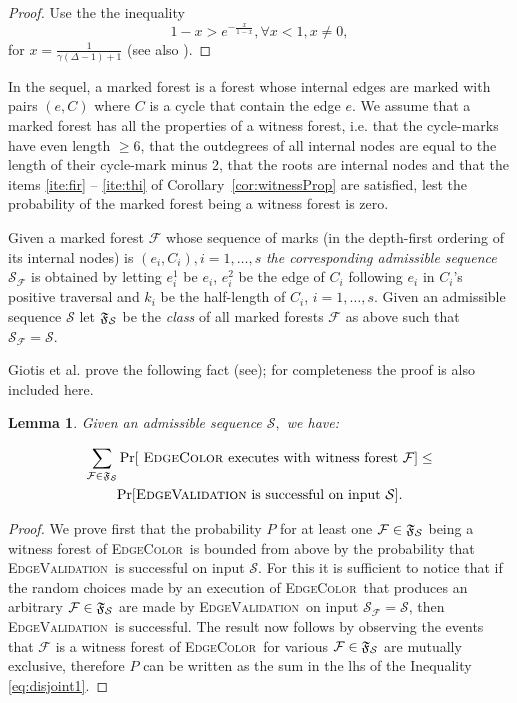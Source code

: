 \documentclass{amsart}
\theoremstyle{plain}
\newtheorem{lemma}{Lemma}
\newcommand{\EC}{\textsc{EdgeColor}}
\newcommand{\ValE}{\textsc{EdgeValidation}}
\begin{document}
\begin{proof} 
Use the  the inequality $$1-x>e^{-\frac{x}{1-x}}, \forall x<1, x \neq 0,$$ 
for $x= \frac{1}{\gamma(\Delta -1)+1}$
(see  also \cite[Corollary 2]{giotis2017acyclic}).
 \end{proof}
 
 In the sequel, a marked forest is a forest whose internal edges are marked with pairs $(e, C)$ where $C$ is a cycle that contain the edge $e$. We assume  that a marked forest has all the properties of a witness forest, i.e. that the cycle-marks have even length $\geq 6$, that the outdegrees of all internal nodes are  equal to the length of their cycle-mark minus 2, that the roots are internal nodes and that the items \ref{ite:fir} -- \ref{ite:thi} of Corollary~\ref{cor:witnessProp} are satisfied, lest the probability of the marked forest being a witness forest is zero.
 
Given a marked forest $\mathcal{F}$ whose  sequence of marks (in the depth-first ordering of its internal nodes)  is $(e_i, C_i), i=1, \ldots,s$ {\em the corresponding admissible sequence} $\mathcal{S}_\mathcal{F}$ is obtained by letting  $e_i^1$ be  $e_i$, $e_i^2$ be the edge of $C_i$  following $e_i$ in $C_i$'s positive traversal and $k_i$ be the half-length of $C_i$, $i=1, \ldots, s$. Given an admissible sequence $\mathcal{S}$ let $\frak{F}_\mathcal{S}$ be the {\em class} of all marked  forests $\mathcal{F}$ as above  such that $\mathcal{S}_\mathcal{F} = \mathcal{S}.$

Giotis et al.  prove  the following fact (see\cite[Proposition 1]{giotis2017acyclic}); for completeness the proof is also included here.

\begin{lemma}\label{lem:proposition}  
Given an admissible sequence ${\mathcal S},$ we have:

\begin{multline}\label{eq:disjoint1}
\sum_{{\mathcal F} \in {\frak F}_{\mathcal S}} \Pr[ \text{ \EC\ executes with  witness forest } {\mathcal F}] \leq \\
	\Pr[\text{\ValE\ is successful on input } {\mathcal S}].\end{multline}
\end{lemma}

\begin{proof} We prove first that the probability  $P$   for at least one ${\mathcal F} \in {\frak F}_{\mathcal S}$ being a witness forest of \EC\ is bounded from above by the probability that \ValE\ is successful on input  ${\mathcal S}$. 
For this it is sufficient to notice that if the random choices made by an execution of \EC\ that produces an arbitrary  ${\mathcal F} \in {\frak F}_{\mathcal S}$ 
are made by \ValE\ on input ${\mathcal S}_{\mathcal F} = {\mathcal S}$, 
then \ValE\ is successful. The result now follows by observing the  events that 
${\mathcal F}$ is a witness forest of \EC\ for various 
${\mathcal F} \in {\frak F}_{\mathcal S}$ are mutually exclusive, therefore $P$ can be written as the sum in the lhs of the Inequality \eqref{eq:disjoint1}.\end{proof}
\end{document}
